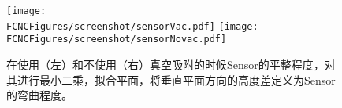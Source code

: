 \begin{figure}[H]
\centering
\texttt{[image: \\FCNCFigures/screenshot/sensorVac.pdf]}
\texttt{[image: \\FCNCFigures/screenshot/sensorNovac.pdf]}
\caption{在使用（左）和不使用（右）真空吸附的时候Sensor的平整程度，对其进行最小二乘，拟合平面，将垂直平面方向的高度差定义为Sensor的弯曲程度。}
\label{fig:sensorVac}
\end{figure}